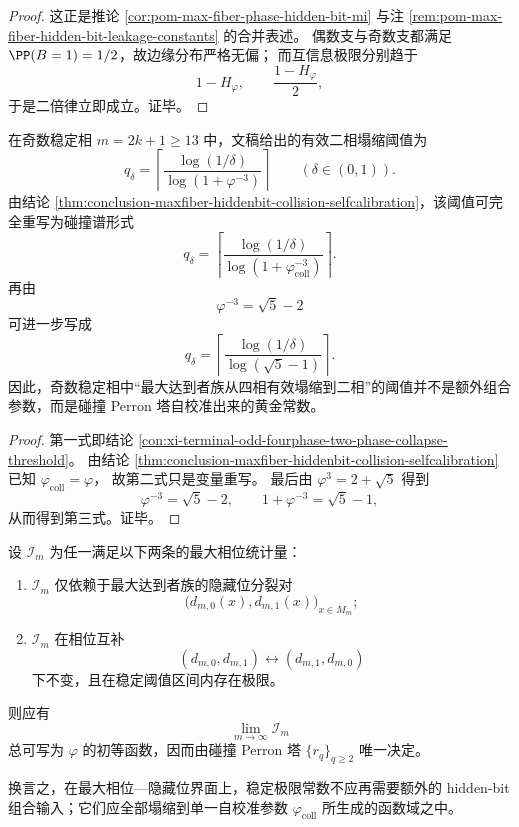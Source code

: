 \begin{proof}
这正是推论 \ref{cor:pom-max-fiber-phase-hidden-bit-mi} 与注 \ref{rem:pom-max-fiber-hidden-bit-leakage-constants} 的合并表述。
偶数支与奇数支都满足 \(\PP(B=1)=1/2\)，故边缘分布严格无偏；
而互信息极限分别趋于
\[
1-H_\varphi,\qquad \frac{1-H_\varphi}{2},
\]
于是二倍律立即成立。证毕。
\end{proof}

\begin{theorem}\label{thm:conclusion-maxfiber-hiddenbit-odd-collapse-threshold-collision-selfcalibrated}
在奇数稳定相 \(m=2k+1\ge 13\) 中，文稿给出的有效二相塌缩阈值为
\[
q_\delta=
\left\lceil
\frac{\log(1/\delta)}{\log(1+\varphi^{-3})}
\right\rceil
\qquad (\delta\in(0,1)).
\]
由结论 \ref{thm:conclusion-maxfiber-hiddenbit-collision-selfcalibration}，该阈值可完全重写为碰撞谱形式
\[
q_\delta=
\left\lceil
\frac{\log(1/\delta)}{\log(1+\varphi_{\mathrm{coll}}^{-3})}
\right\rceil.
\]
再由
\[
\varphi^{-3}=\sqrt5-2
\]
可进一步写成
\[
q_\delta=
\left\lceil
\frac{\log(1/\delta)}{\log(\sqrt5-1)}
\right\rceil.
\]
因此，奇数稳定相中“最大达到者族从四相有效塌缩到二相”的阈值并不是额外组合参数，而是碰撞 Perron 塔自校准出来的黄金常数。
\end{theorem}

\begin{proof}
第一式即结论 \ref{con:xi-terminal-odd-fourphase-two-phase-collapse-threshold}。
由结论 \ref{thm:conclusion-maxfiber-hiddenbit-collision-selfcalibration} 已知
\(
\varphi_{\mathrm{coll}}=\varphi
\)，
故第二式只是变量重写。
最后由
\(
\varphi^3=2+\sqrt5
\)
得到
\[
\varphi^{-3}=\sqrt5-2,
\qquad
1+\varphi^{-3}=\sqrt5-1,
\]
从而得到第三式。证毕。
\end{proof}

\begin{conjecture}\label{conj:conclusion-maxfiber-hiddenbit-all-constants-from-collision-spectrum}
设 \(\mathcal I_m\) 为任一满足以下两条的最大相位统计量：
\begin{enumerate}
  \item \(\mathcal I_m\) 仅依赖于最大达到者族的隐藏位分裂对
  \[
  \bigl(d_{m,0}(x),d_{m,1}(x)\bigr)_{x\in M_m};
  \]
  \item \(\mathcal I_m\) 在相位互补
  \[
  (d_{m,0},d_{m,1})\longleftrightarrow(d_{m,1},d_{m,0})
  \]
  下不变，且在稳定阈值区间内存在极限。
\end{enumerate}
则应有
\[
\lim_{m\to\infty}\mathcal I_m
\]
总可写为 \(\varphi\) 的初等函数，因而由碰撞 Perron 塔 \(\{r_q\}_{q\ge2}\) 唯一决定。

换言之，在最大相位—隐藏位界面上，稳定极限常数不应再需要额外的 hidden-bit 组合输入；它们应全部塌缩到单一自校准参数 \(\varphi_{\mathrm{coll}}\) 所生成的函数域之中。
\end{conjecture}


